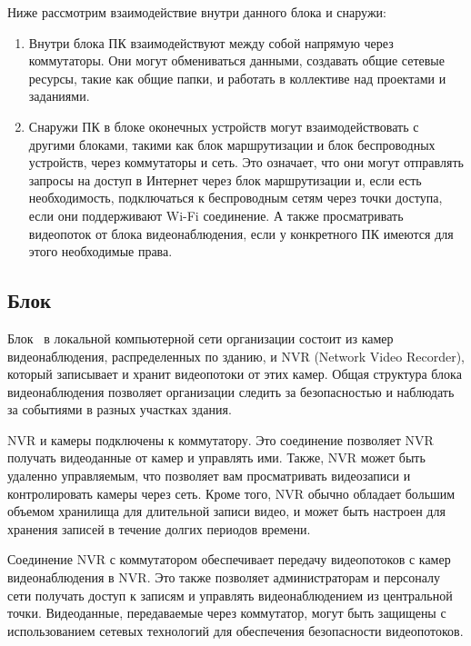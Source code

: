 Ниже рассмотрим взаимодействие внутри данного блока и снаружи:

\begin{enumerate}
    \item Внутри блока ПК взаимодействуют между собой напрямую через коммутаторы. 
    Они могут обмениваться данными, создавать общие сетевые ресурсы, такие как общие папки, и работать в коллективе над проектами и заданиями.
    
    \item Снаружи ПК в блоке оконечных устройств могут взаимодействовать с другими блоками, 
    такими как блок маршрутизации и блок беспроводных устройств, через коммутаторы и сеть. 
    Это означает, что они могут отправлять запросы на доступ в Интернет через блок маршрутизации и,
    если есть необходимость, подключаться к беспроводным сетям через точки доступа, если они поддерживают Wi-Fi соединение.
    А также просматривать видеопоток от блока видеонаблюдения, если у конкретного ПК имеются для этого необходимые права. 
\end{enumerate}

\subsection{Блок \blockVideo}

Блок \blockVideo\ в локальной компьютерной сети организации состоит из камер видеонаблюдения, распределенных по зданию, и NVR (Network Video Recorder), 
который записывает и хранит видеопотоки от этих камер. 
Общая структура блока видеонаблюдения позволяет организации следить за безопасностью и наблюдать за событиями в разных участках здания. 

NVR и камеры подключены к коммутатору. Это соединение позволяет NVR получать видеоданные от камер и управлять ими. 
Также, NVR может быть удаленно управляемым, что позволяет вам просматривать видеозаписи и контролировать камеры через сеть.
Кроме того, NVR обычно обладает большим объемом хранилища для длительной записи видео, 
и может быть настроен для хранения записей в течение долгих периодов времени.

Соединение NVR с коммутатором обеспечивает передачу видеопотоков с камер видеонаблюдения в NVR.
Это также позволяет администраторам и персоналу сети получать доступ к записям и управлять видеонаблюдением из центральной точки.
Видеоданные, передаваемые через коммутатор, могут быть защищены с использованием сетевых технологий для обеспечения безопасности видеопотоков.

